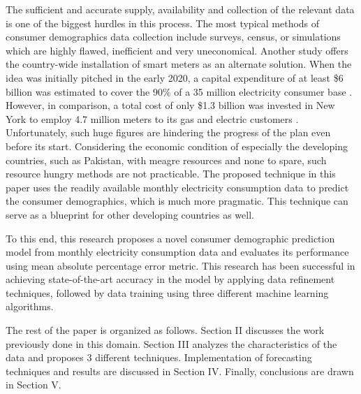 \documentclass[conference]{IEEEtran}
\begin{document}
The sufficient and accurate supply, availability and collection of the relevant data is one of the biggest hurdles in this process. The most typical methods of consumer demographics data collection include surveys, census, or simulations which are highly flawed, inefficient and very uneconomical. Another study offers the country-wide installation of smart meters as an alternate solution. When the idea was initially pitched in the early 2020, a capital expenditure of at least \$6 billion was estimated to cover the 90\% of a 35 million electricity consumer base \cite{theexpresstribune_2020}. However, in comparison, a total cost of only \$1.3 billion was invested in New York to employ 4.7 million meters to its gas and electric customers \cite{tweed_2015}. Unfortunately, such huge figures are hindering the progress of the plan even before its start. Considering the economic condition of especially the developing countries, such as Pakistan, with meagre resources and none to spare, such resource hungry methods are not practicable. The proposed technique in this paper uses the readily available monthly electricity consumption data to predict the consumer demographics, which is much more pragmatic. This technique can serve as a blueprint for other developing countries as well.


To this end, this research proposes a novel consumer demographic prediction model from monthly electricity consumption data and evaluates its performance using mean absolute percentage error metric. This research has been successful in achieving state-of-the-art accuracy in the model by applying data refinement techniques, followed by data training using three different machine learning algorithms.

The rest of the paper is organized as follows. Section II discusses the work previously done in this domain. Section III analyzes the characteristics of the data and proposes 3 different techniques. Implementation of forecasting techniques and results are discussed in Section IV. Finally, conclusions are drawn in Section V. 
\end{document}
